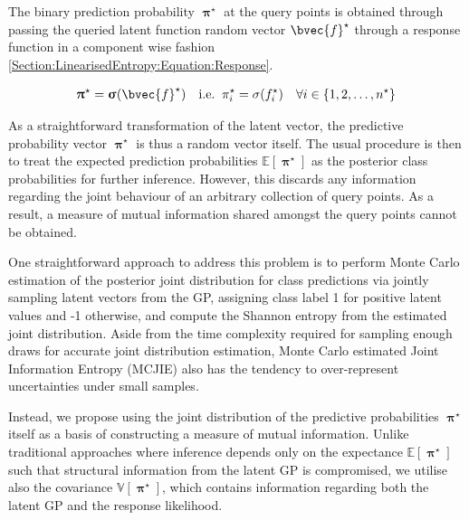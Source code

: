 \documentclass{article}
\renewcommand{\vec}[1]{\boldsymbol{#1}}
\begin{document}
		The binary prediction probability $\vec{\uppi^{\star}}$ at the query points is obtained through passing the queried latent function random vector $\bvec{f}^{\star}$ through a response function in a component wise fashion \eqref{Section:LinearisedEntropy:Equation:Response}.
		
		\begin{equation}
			\vec{\uppi}^{\star} = \vec{\upsigma}(\bvec{f}^{\star})\mathrm{ \quad i.e. \;\;}\pi^{\star}_{i} = \sigma(f^{\star}_{i}) \quad \forall i \in \{1, 2, \dots, n^{\star}\}
		\label{Section:LinearisedEntropy:Equation:Response}
		\end{equation}
		
		As a straightforward transformation of the latent vector, the predictive probability vector $\vec{\uppi^{\star}}$ is thus a random vector itself. The usual procedure is then to treat the expected prediction probabilities $\mathbb{E}[\vec{\uppi^{\star}}]$ as the posterior class probabilities for further inference. However, this discards any information regarding the joint behaviour of an arbitrary collection of query points. As a result, a measure of mutual information shared amongst the query points cannot be obtained.
		
		One straightforward approach to address this problem is to perform Monte Carlo estimation of the posterior joint distribution for class predictions via jointly sampling latent vectors from the GP, assigning class label 1 for positive latent values and -1 otherwise, and compute the Shannon entropy \cite{ShannonEntropy} from the estimated joint distribution. Aside from the time complexity required for sampling enough draws for accurate joint distribution estimation, Monte Carlo estimated Joint Information Entropy (MCJIE) also has the tendency to over-represent uncertainties under small samples.
				
		Instead, we propose using the joint distribution of the predictive probabilities $\vec{\uppi^{\star}}$ itself as a basis of constructing a measure of mutual information. Unlike traditional approaches where inference depends only on the expectance $\mathbb{E}[\vec{\uppi^{\star}}]$ such that structural information from the latent GP is compromised, we utilise also the covariance $\mathbb{V}[\vec{\uppi^{\star}}]$, which contains information regarding both the latent GP and the response likelihood.
	
\end{document}

